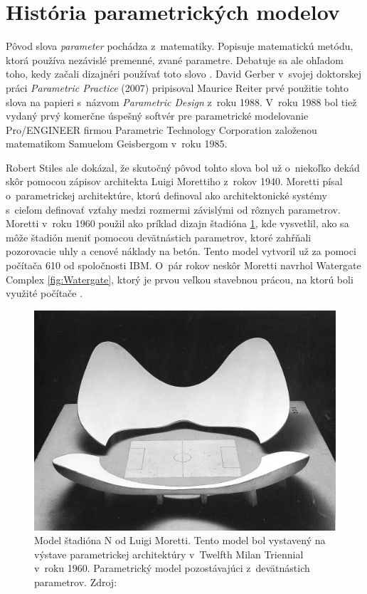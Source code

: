 \section{História parametrických modelov}



Pôvod slova \textit{parameter} pochádza z~matematiky. Popisuje matematickú metódu, ktorá používa nezávislé premenné, zvané parametre. Debatuje sa ale ohľadom toho, kedy začali dizajnéri používať toto slovo \cite{davis_2013}. David Gerber v~svojej doktorskej práci \textit{Parametric Practice} (2007) pripisoval Maurice Reiter prvé použitie tohto slova na papieri s~názvom \textit{Parametric Design} z~roku 1988. V~roku 1988 bol tiež vydaný prvý komerčne úspešný softvér pre parametrické modelovanie \textsf{Pro/ENGINEER} firmou Parametric Technology Corporation založenou matematikom Samuelom Geisbergom v~roku 1985.

Robert Stiles ale dokázal, že skutočný pôvod tohto slova bol už o~niekoľko dekád skôr pomocou zápisov architekta Luigi Morettiho z~rokov 1940.  Moretti písal o~parametrickej architektúre, ktorú definoval ako architektonické systémy s~cieľom 
definovať vzťahy medzi rozmermi závislými od rôznych parametrov.
Moretti v~roku 1960 použil ako príklad dizajn štadióna \ref{fig:morretiStadion}, kde vysvetlil, ako sa môže štadión meniť pomocou devätnástich parametrov, ktoré zahŕňali pozorovacie uhly a cenové náklady na betón. Tento model vytvoril už za pomoci počítača 610 od spoločnosti IBM\cite{doi:10.1002/ad.2019}. O~pár rokov neskôr Moretti navrhol Watergate Complex \ref{fig:Watergate}, ktorý je prvou veľkou stavebnou prácou, na ktorú boli využité počítače \cite{davis_2013}. 


\begin{figure}[H]
    \centering
    \includegraphics[width = \linewidth]{obrazky-figures/moretti_1.jpg}
    \caption{Model štadióna N od Luigi Moretti. Tento model bol vystavený na výstave parametrickej architektúry v~Twelfth Milan Triennial v~roku 1960. Parametrický model pozostávajúci z~devätnástich parametrov. Zdroj:  \cite{davis_2013}}
    \label{fig:morretiStadion}
\end{figure}

